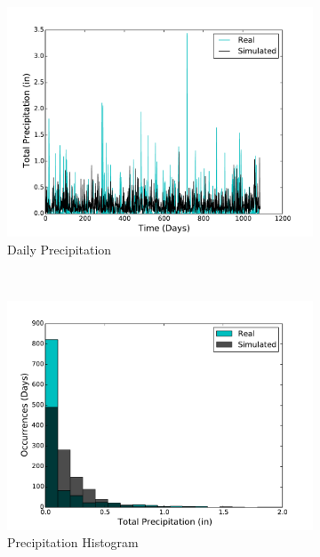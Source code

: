 \documentclass[conference]{IEEEtran}
\begin{document}
\begin{figure}[!t]
\begin{subfigure}[b]{0.4\textwidth}
    \includegraphics[width=\textwidth]{figures/daily_precip.pdf}
    \caption{Daily Precipitation}
  \end{subfigure}
  ~
  \begin{subfigure}[b]{0.4\textwidth}
    \includegraphics[width=\textwidth]{figures/daily_precip_hist.pdf}
    \caption{Precipitation Histogram}
  \end{subfigure}
  ~
  \begin{subfigure}[b]{0.4\textwidth}

\end{subfigure}
\end{figure}
\end{document}
